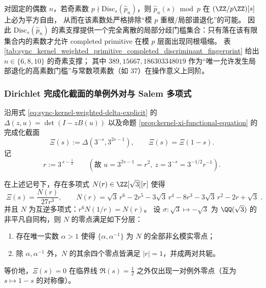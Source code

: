 \begin{remark}\label{rem:hatp-local-double-root-prime-support}
对固定的偶数 \(n\)，若奇素数 \(p\nmid \mathrm{Disc}_s(\widehat p_n)\)，则 \(\widehat p_n(s)\bmod p\) 在 \((\ZZ/p\ZZ)[s]\) 上必为平方自由，
从而在该素数处严格排除“模 \(p\) 重根/局部谱退化”的可能。
因此 \(\mathrm{Disc}_s(\widehat p_n)\) 的素支撑提供一个完全离散的局部分歧门槛集合：只有落在该有限集合内的素数才允许 completed primitive 在模 \(p\) 层面出现同根塌缩。
表 \ref{tab:sync_kernel_weighted_primitive_completed_discriminant_fingerprint} 给出 \(n\in\{6,8,10\}\) 的奇素支撑；
其中 \(389,15667,186303348019\) 作为“唯一允许发生局部退化的高素数门槛”与常数项素数（如 \(37\)）在操作意义上同阶。
\end{remark}



\subsubsection{Dirichlet 完成化截面的单例外对与 Salem 多项式}\label{app:sync-kernel-weighted-dirichlet-xi-single-exception}
沿用式 \eqref{eq:sync-kernel-weighted-delta-explicit} 的 \(\Delta(z,u)=\det(I-zB(u))\) 以及命题 \ref{prop:kernel-xi-functional-equation} 的完成化截面
\[
\Xi(s):=\Delta(3^{-s},3^{2s-1}),
\qquad
\Xi(s)=\Xi(1-s).
\]
记
\[
r:=3^{\,s-\frac12}\qquad(\text{故 }u=3^{2s-1}=r^2,\ z=3^{-s}=3^{-1/2}r^{-1}).
\]

\begin{theorem}[完成化零点的单例外对结构]\label{thm:sync-kernel-weighted-xi-single-exception-pair}
在上述记号下，存在多项式 \(N(r)\in\ZZ[\sqrt3][r]\) 使得
\begin{equation}\label{eq:sync-kernel-weighted-xi-Nr-quotient}
\boxed{\;
\Xi(s)=\frac{N(r)}{27r^3},
\qquad
N(r)=\sqrt3\,r^6-2r^5-3\sqrt3\,r^4-8r^3-3\sqrt3\,r^2-2r+\sqrt3\; }.
\end{equation}
并且 \(N\) 为互逆多项式：\(r^6N(1/r)=N(r)\)。
设 \(\sigma:\sqrt3\mapsto-\sqrt3\) 为 \(\QQ(\sqrt3)\) 的非平凡自同构，则 \(N\) 的零点满足如下分层：
\begin{enumerate}
  \item 存在唯一实数 \(\alpha>1\) 使得 \(\{\alpha,\alpha^{-1}\}\) 为 \(N\) 的全部非幺模实零点；
  \item 除 \(\alpha,\alpha^{-1}\) 外，\(N\) 的其余四个零点皆满足 \(|r|=1\)，并成两对共轭。
\end{enumerate}
等价地，\(\Xi(s)=0\) 在临界线 \(\Re(s)=\tfrac12\) 之外仅出现一对例外零点（互为 \(s\mapsto 1-s\) 的对称像）。
\end{theorem}

